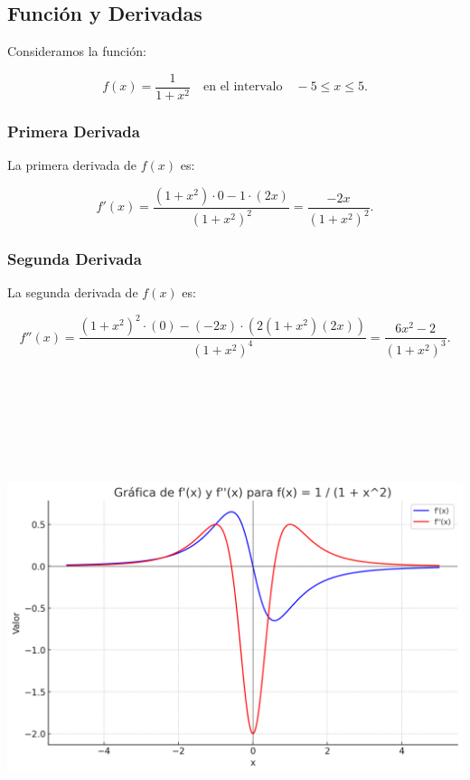 \documentclass[11pt,letterpaper]{article}
\begin{document}
\subsection*{Función y Derivadas}

Consideramos la función:

\[
f(x) = \frac{1}{1+x^2} \quad \text{en el intervalo} \quad -5 \leq x \leq 5.
\]

\subsubsection*{Primera Derivada}

La primera derivada de \( f(x) \) es:

\[
f'(x) = \frac{(1+x^2) \cdot 0 - 1 \cdot (2x)}{(1+x^2)^2} = \frac{-2x}{(1+x^2)^2}.
\]

\subsubsection*{Segunda Derivada}

La segunda derivada de \( f(x) \) es:

\[
f''(x) = \frac{(1+x^2)^2 \cdot (0) - (-2x) \cdot (2(1+x^2)(2x))}{(1+x^2)^4} = \frac{6x^2 - 2}{(1+x^2)^3}.
\]

\begin{center}
    \includegraphics[height=15.0cm]{./imagenes/grafica1.png}
\end{center}
\end{document}
